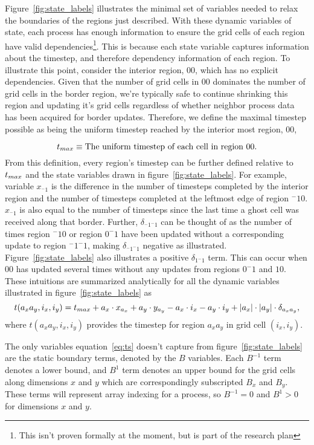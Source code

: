 Figure~\ref{fig:state_labels} illustrates the minimal set of
variables needed to relax the boundaries of the regions
just described.
With these dynamic variables of state, each process has enough information
to ensure the grid cells
of each region have valid dependencies\footnote{
  This isn't proven formally at the moment, but is part of the research plan
}.
This is because each state variable captures information about the timestep,
and therefore dependency information of each region.  To illustrate this point,
consider the interior region, $00$, which
has no explicit dependencies.  Given that the number of grid cells in $00$
dominates the number of grid cells in the border region, we're
typically safe to continue shrinking this region
and updating it's grid cells regardless of whether neighbor
process data has been acquired for border updates.
Therefore, we define the maximal timestep possible as being
the uniform timestep reached by the interior most
region, $00$,

\begin{equation}
  \text{$t_{max}$} \equiv \text{The uniform timestep of each cell in region $00$}.
\end{equation}
From this definition, every region's timestep can be further defined relative to $\text{$t_{max}$}$ and the state
variables drawn in figure~\ref{fig:state_labels}.  For example, variable $x_{^-1}$ is the difference in the
 number of timesteps completed by the interior region and the number of timesteps completed at the leftmost edge
 of region $^-10$.  $x_{^-1}$ is also equal to the number of timesteps since the last time a ghost cell was received along
 that border.  Further, $\delta_{^-1^-1}$ can be thought of as the number of times
region $^-10$ or region $0^-1$ have been updated without a corresponding update to region $^-1^-1$, making $\delta_{^-1^-1}$
negative as illustrated.  Figure~\ref{fig:state_labels} also illustrates a positive
 $\delta_{1^-1}$ term.  This can occur when $00$ has updated several times without
any updates from regions $0^-1$ and $10$.  These intuitions are
summarized analytically for all the dynamic variables illustrated
in figure~\ref{fig:state_labels} as
\begin{equation}
  t(a_xa_y,i_x,i_y) = \text{$t_{max}$} +
  a_x \cdot x_{a_x} + a_y \cdot y_{a_y} -
  a_x \cdot i_x - a_y \cdot i_y +
  |a_x|\cdot|a_y|\cdot\delta_{a_xa_y},
  \label{eq:ts}
\end{equation}
where $t(a_xa_y,i_x,i_y)$ provides the timestep for region $a_xa_y$ in grid cell $(i_x,i_y)$.

The only variables equation~\eqref{eq:ts} doesn't capture from figure~\ref{fig:state_labels} are the
static boundary terms, denoted by the $B$ variables.  Each $B^{-1}$ term denotes a lower bound, and $B^1$
 term
denotes an upper bound for the grid cells along dimensions $x$ and $y$ which are
correspondingly subscripted $B_x$ and $B_y$.
  These terms will represent array indexing for a process, so $B^{-1} = 0$ and $B^1 > 0$
  for dimensions $x$ and $y$.

